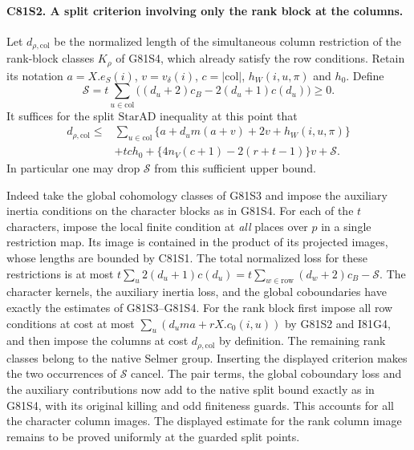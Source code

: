 \paragraph{C81S2. A split criterion involving only the rank block at the columns.}
Let $d_{\rho,\mathrm{col}}$ be the normalized length of the
simultaneous column restriction of the rank-block classes
$K_\rho$ of G81S4, which already satisfy the row conditions.
Retain its notation $a=X.e_S(i)$, $v=v_\delta(i)$,
$c=|\mathrm{col}|$, $h_W(i,u,\pi)$ and $h_0$. Define
\[
 \mathcal S=t\sum_{u\in\mathrm{col}}
       \bigl((d_u+2)c_B-2(d_u+1)c(d_u)\bigr)\ge0 .
\]
It suffices for the split $\mathrm{StarAD}$ inequality at this
point that
\[
\begin{split}
 d_{\rho,\mathrm{col}}\le{}&
 \sum_{u\in\mathrm{col}}
       \{a+d_um(a+v)+2v+h_W(i,u,\pi)\}\\
 &+tc h_0+\{4n_V(c+1)-2(r+t-1)\}v+\mathcal S .
\end{split}
\]
In particular one may drop $\mathcal S$ from this sufficient
upper bound.

Indeed take the global cohomology classes of G81S3 and impose
the auxiliary inertia conditions on the character blocks as in
G81S4. For each of the $t$ characters, impose the local finite
condition at \emph{all} places over $p$ in a single restriction
map. Its image is contained in the product of its projected
images, whose lengths are bounded by C81S1. The total normalized
loss for these restrictions is at most
$t\sum_{u}2(d_u+1)c(d_u)
=t\sum_{w\in\mathrm{row}}(d_w+2)c_B-\mathcal S$.
The character kernels, the auxiliary inertia loss, and the global
coboundaries have exactly the estimates of G81S3--G81S4.
For the rank block first impose all row conditions at cost at
most $\sum_u(d_um a+rX.c_0(i,u))$ by G81S2 and I81G4, and then
impose the columns at cost $d_{\rho,\mathrm{col}}$ by definition.
The remaining rank classes belong to the native Selmer group.
Inserting the displayed criterion makes the two occurrences of
$\mathcal S$ cancel. The pair terms, the global coboundary loss
and the auxiliary contributions now add to the native split
bound exactly as in G81S4, with its original killing and odd
finiteness guards. This accounts for all the character column
images. The displayed estimate for the rank column image remains
to be proved uniformly at the guarded split points.
